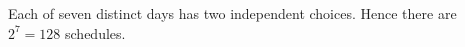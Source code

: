 Each of seven distinct days has two independent choices. Hence there are $2^7=\boxed{128}$ schedules.
